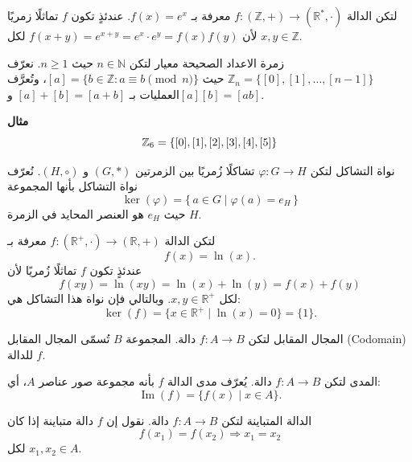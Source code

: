 \begin{example}
	لتكن الدالة $f : (\mathbb{Z}, +) \to (\mathbb{R}^*, \cdot)$ معرفة بـ $f(x) = e^x$. عندئذٍ تكون $f$ تماثلًا زمريًا لأن
	\linebreak $f(x+y) = e^{x+y} = e^x \cdot e^y = f(x)f(y)$ لكل $x,y \in \mathbb{Z}$.
\end{example}

\begin{definition}{زمرة الاعداد الصحيحة معيار }{\cite{ref3}}
	لتكن $n \in \mathbb{N}$ حيث $n \ge 1$. نعرّف $\mathbb{Z}_n = \{ [0], [1], \dots, [n-1] \}$ حيث \linebreak$[a] = \{ b \in \mathbb{Z} : a \equiv b \pmod{n} \}$، وتُعرَّف العمليات بـ $[a] + [b] = [a+b]$ و$[a][b] = [ab]$.
\end{definition}
\noindent\textbf{مثال}
\[
\mathbb{Z}_6 = \{[0], [1], [2], [3], [4], [5]\}
\]

\begin{definition}{نواة التشاكل}{\cite{ref6}}
	لتكن $\varphi : G \to H$ تشاكلًا زُمريًا بين الزمرتين $(G, *)$ و $(H, \circ)$.
	نُعرّف نواة التشاكل بأنها المجموعة
	\[
	\ker(\varphi) = \{\, a \in G \mid \varphi(a) = e_H \,\}
	\]
	حيث $e_H$ هو العنصر المحايد في الزمرة $H$.
\end{definition}


\begin{example}
	لتكن الدالة $f : (\mathbb{R}^+, \cdot) \to (\mathbb{R}, +)$ معرفة بـ
	\[
	f(x) = \ln(x).
	\]
	عندئذٍ تكون $f$ تماثلًا زُمريًا لأن
	\[
	f(xy) = \ln(xy) = \ln(x) + \ln(y) = f(x) + f(y)
	\]
	لكل $x,y \in \mathbb{R}^+$.
	وبالتالي فإن نواة هذا التشاكل هي:
	\[
	\ker(f) = \{x \in \mathbb{R}^+ \mid \ln(x) = 0\} = \{1\}.
	\]
\end{example}



\begin{definition}{المجال المقابل}{}
	لتكن $f: A \to B$ دالة. المجموعة $B$ تُسمّى المجال المقابل (Codomain) للدالة $f$.
\end{definition}

\begin{definition}{المدى}{}
	لتكن $f: A \to B$ دالة. يُعرّف مدى الدالة $f$ بأنه مجموعة صور عناصر $A$، أي:
	\[
	\operatorname{Im}(f) = \{ f(x) \mid x \in A \}.
	\]
\end{definition}

\begin{definition}{الدالة المتباينة}{}
	لتكن $f: A \to B$ دالة. نقول إن $f$ دالة متباينة إذا كان
	\[
	f(x_1) = f(x_2) \Rightarrow x_1 = x_2
	\]
	لكل $x_1, x_2 \in A$.
\end{definition}

